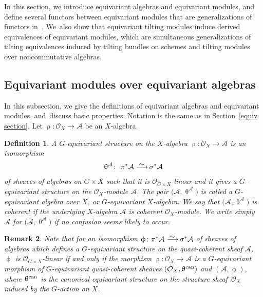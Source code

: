 \documentclass[pdftex]{sigma}%
\newtheorem{dfn}{Definition}[section]
\newtheorem{rem}[dfn]{Remark}
\numberwithin{equation}{section}
\newcommand{\cA}{\mathcal{A}}
\newcommand{\cO}{\mathcal{O}}
\newcommand{\simto}{\,\,\,\,\raisebox{4pt}{$\sim$}{\kern -1.1em \longrightarrow}\,}
\begin{document}
In this section, we introduce equivariant algebras and equivariant modules, and define seve\-ral functors between equivariant modules that are generalizations of functors in~\cite[Section~2]{bfk}. We~also show that equivariant tilting modules induce derived equivalences of equivariant modules, which are simultaneous generalizations of tilting equivalences induced by tilting bundles on schemes and tilting modules over noncommutative algebras.

\subsection{Equivariant modules over equivariant algebras}

In this subsection, we give the definitions of equivariant algebras and equivariant modules, and~dis\-cuss basic properties.
Notation is the same as in Section~\ref{equiv section}. Let $\uprho\colon \cO_X\to \cA$ be an $X$-algebra.

\begin{dfn}
A {\it $G$-equivariant structure} on the $X$-algebra $\uprho\colon \cO_X\to\cA$ is an isomorphism
\begin{gather*}
\uptheta^{\cA}\colon\ \pi^*\cA\simto \sigma^*\cA
\end{gather*}
 of sheaves of algebras on $G\times X$
such that it is $\cO_{G\times X}$-linear and it gives a $G$-equivariant structure on the $\cO_X$-module $\cA$. The pair $\big(\cA,\uptheta^{\cA}\big)$ is called a {\it $G$-equivariant algebra over $X$}, or {\it $G$-equivariant $X$-algebra}. We say that $\big(\cA,\uptheta^{\cA}\big)$ is {\it coherent} if the underlying $X$-algebra $\cA$ is coherent $\cO_X$-module. We write simply $\cA$ for $\big(\cA,\uptheta^{\cA}\big)$ if no confusion seems likely to occur.
\end{dfn}

\begin{rem}\label{linearity}
Note that for an isomorphism $\upphi \colon \pi^*\cA\simto \sigma^*\cA$ of sheaves of algebras which defines a $G$-equivariant structure on the quasi-coherent sheaf $\cA$, $\upphi$ is $\cO_{G\times X}$-linear if and only if the morphism $\uprho\colon \cO_X\to \cA$ is a $G$-equivariant morphism of $G$-equivariant quasi-coherent sheaves $(\cO_X,\uptheta^{\rm can})$ and $(\cA,\upphi)$, where $\uptheta^{\rm can}$ is the canonical equivariant structure on the structure sheaf~$\cO_X$ induced by the $G$-action on $X$.
\end{rem}
\end{document}
